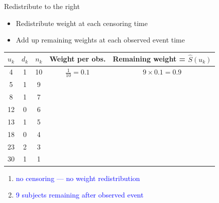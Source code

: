 \documentclass[10pt,t]{beamer}
\begin{document}
\begin{frame}{Redistribute to the right}
	\begin{itemize}
		\item Redistribute weight at each censoring time
		\item Add up remaining weights at each observed event time
	\end{itemize}
	\begin{footnotesize}
		\begin{tabular}{|c|c|c|c|c|}
			\hline
			$u_k$ & $d_k$ & $n_k$ & Weight per obs. & Remaining weight = $\widehat{S}(u_k)$ \\
			\hline
			4 & 1 & 10 & $\frac{1}{10} = 0.1$ & $9\times 0.1= 0.9$\\
			5 & 1 & 9 & & \\
			8 & 1 & 7 & & \\
			12 & 0 & 6 & & \\
			13 & 1 & 5 & & \\
			18 & 0 & 4 & & \\
			23 & 2 & 3 & & \\
			30 & 1 & 1 & & \\
			\hline
		\end{tabular}
	\end{footnotesize}
	\begin{enumerate}
		\item \textcolor{blue}{no censoring --- no weight redistribution}
		\item \textcolor{blue}{9 subjects remaining after observed event}
	\end{enumerate}
\end{frame}
\end{document}
